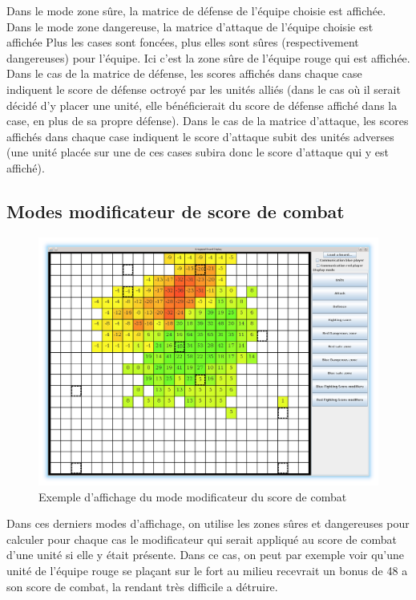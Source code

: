 			Dans le mode zone sûre, la matrice de défense de l'équipe choisie est affichée.
			Dans le mode zone dangereuse, la matrice d'attaque de l'équipe choisie est affichée
			Plus les cases sont foncées, plus elles sont sûres (respectivement dangereuses) pour l'équipe.
			Ici c'est la zone sûre de l'équipe rouge qui est affichée.
            Dans le cas de la matrice de défense, les scores affichés dans chaque case indiquent le score de défense octroyé par les unités alliés (dans le cas où il serait décidé d'y placer une unité, elle bénéficierait du score de défense affiché dans la case, en plus de sa propre défense).
            Dans le cas de la matrice d'attaque, les scores affichés dans chaque case indiquent le score d'attaque subit des unités adverses (une unité placée sur une de ces cases subira donc le score d'attaque qui y est affiché).

			\clearpage

		\subsection{Modes modificateur de score de combat}
			\begin{figure}[!h]
				\centerline{\includegraphics[scale=0.4]{images/screen_fsmod.png}}
				\caption{Exemple d'affichage du mode modificateur du score de combat}
			\end{figure}
			Dans ces derniers modes d'affichage, on utilise les zones sûres et dangereuses pour calculer pour chaque cas le modificateur
			qui serait appliqué au score de combat d'une unité si elle y était présente.
			Dans ce cas, on peut par exemple voir qu'une unité de l'équipe rouge se plaçant sur le fort au milieu recevrait un bonus de 48 a son score de combat, la rendant très difficile a détruire.

